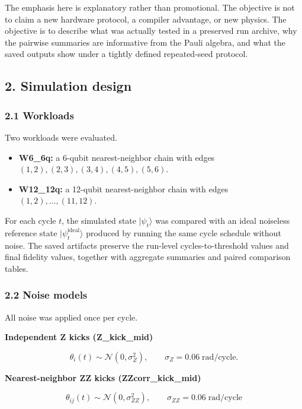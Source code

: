 \documentclass[
]{article}
\providecommand{\tightlist}{%
  \setlength{\itemsep}{0pt}\setlength{\parskip}{0pt}}
\begin{document}
The emphasis here is explanatory rather than promotional. The objective
is not to claim a new hardware protocol, a compiler advantage, or new
physics. The objective is to describe what was actually tested in a
preserved run archive, why the pairwise summaries are informative from
the Pauli algebra, and what the saved outputs show under a tightly
defined repeated-seed protocol.

\subsection{2. Simulation design}\label{simulation-design}

\subsubsection{2.1 Workloads}\label{workloads}

Two workloads were evaluated.

\begin{itemize}
\tightlist
\item
  \textbf{W6\_6q:} a 6-qubit nearest-neighbor chain with edges
  \((1,2),(2,3),(3,4),(4,5),(5,6)\).
\item
  \textbf{W12\_12q:} a 12-qubit nearest-neighbor chain with edges
  \((1,2),\ldots,(11,12)\).
\end{itemize}

For each cycle \(t\), the simulated state \(|\psi_t\rangle\) was
compared with an ideal noiseless reference state
\(|\psi_t^{\mathrm{ideal}}\rangle\) produced by running the same cycle
schedule without noise. The saved artifacts preserve the run-level
cycles-to-threshold values and final fidelity values, together with
aggregate summaries and paired comparison tables.

\subsubsection{2.2 Noise models}\label{noise-models}

All noise was applied once per cycle.

\textbf{Independent Z kicks (Z\_kick\_mid)}

\[
\theta_i(t) \sim \mathcal{N}(0,\sigma_Z^2), \qquad \sigma_Z = 0.06 \; \mathrm{rad/cycle}.
\]

\textbf{Nearest-neighbor ZZ kicks (ZZcorr\_kick\_mid)}

\[
\theta_{ij}(t) \sim \mathcal{N}(0,\sigma_{ZZ}^2), \qquad \sigma_{ZZ} = 0.06 \; \mathrm{rad/cycle}
\]
\end{document}
